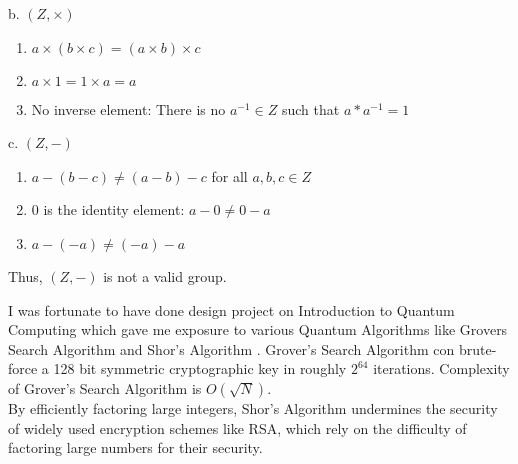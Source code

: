\documentclass[11pt]{article}
\begin{document}
b. \((Z, \times)\)
\begin{enumerate}
    \item \(a \times (b \times c) = (a \times b) \times c\)
    \item \(a \times 1 = 1 \times a = a\)
    \item No inverse element: There is no \(a^{-1} \in Z\) such that \(a \ast a^{-1} = 1\)
\end{enumerate}

c. \((Z, -)\)
\begin{enumerate}
    \item \(a - (b - c) \neq (a - b) - c\) for all \(a, b, c \in Z\)
    \item \(0\) is the identity element: \(a - 0 \neq 0 - a\)
    \item \(a - (-a) \neq (-a) - a\)
\end{enumerate}
Thus, \((Z, -)\) is not a valid group.



\begin{mybox}[frametitle=Quantum Search Algorithm's and Cryptography]
I was fortunate to have done design project on Introduction to Quantum Computing which gave me exposure to various Quantum Algorithms like Grovers Search Algorithm and Shor's Algorithm . 
Grover's Search Algorithm con brute-force a 128 bit symmetric cryptographic key in roughly $2^{64}$ iterations. Complexity of Grover's Search Algorithm is $O(\sqrt{N})$.
\\By efficiently factoring large integers, Shor's Algorithm undermines the security of widely used encryption schemes like RSA, which rely on the difficulty of factoring large numbers for their security.

\end{mybox}
\end{document}
